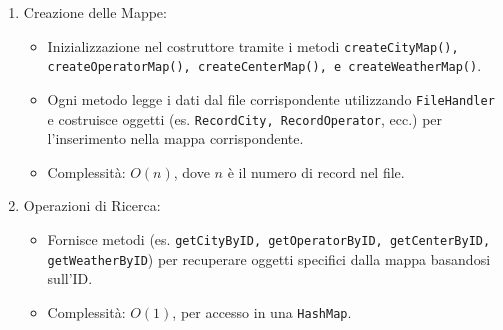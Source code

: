 \begin{enumerate}
    \item Creazione delle Mappe:
    \begin{itemize}
        \item Inizializzazione nel costruttore tramite i metodi \texttt{createCityMap(), createOperatorMap(), createCenterMap(), e createWeatherMap()}.
        \item Ogni metodo legge i dati dal file corrispondente utilizzando \texttt{FileHandler} e costruisce oggetti (es. \texttt{RecordCity, RecordOperator}, ecc.)
        per l'inserimento nella mappa corrispondente.
        \item Complessità: $O(n)$, dove $n$ è il numero di record nel file. 
    \end{itemize}
    \item Operazioni di Ricerca:
    \begin{itemize}
        \item Fornisce metodi (es. \texttt{getCityByID, getOperatorByID, getCenterByID, getWeatherByID}) per recuperare oggetti specifici dalla mappa basandosi sull'ID.
        \item Complessità: $O(1)$, per accesso in una \texttt{HashMap}.
    \end{itemize}
\end{enumerate}

